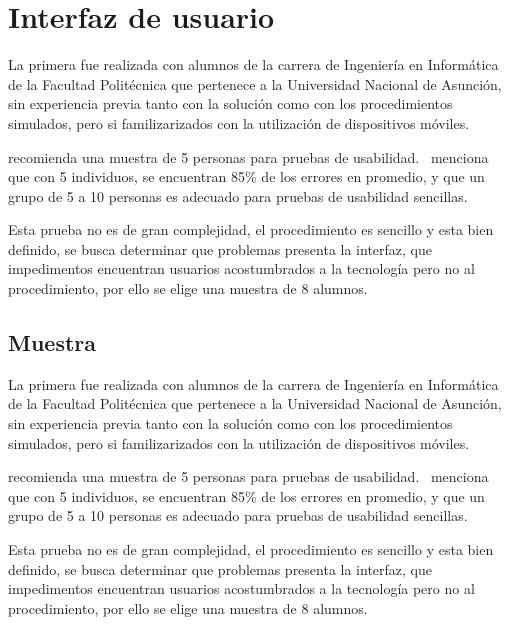 \section{Interfaz de usuario}

La primera fue realizada con alumnos de la carrera de Ingeniería en Informática
de la Facultad Politécnica que pertenece a la Universidad Nacional de Asunción,
sin experiencia previa tanto con la solución como con los procedimientos
simulados, pero si familizarizados con la utilización de dispositivos móviles.

\cite{nielsen2000} recomienda una muestra de 5 personas para pruebas de
usabilidad.~\cite{ritch2009} menciona que con 5 individuos, se encuentran 85\%
de los errores en promedio, y que un grupo de 5 a 10 personas es adecuado para
pruebas de usabilidad sencillas.

Esta prueba no es de gran complejidad, el procedimiento es sencillo y esta
bien definido, se busca determinar que problemas presenta la interfaz, que
impedimentos encuentran usuarios acostumbrados a la tecnología pero no al
procedimiento, por ello se elige una muestra de 8 alumnos.

\subsection{Muestra}

La primera fue realizada con alumnos de la carrera de Ingeniería en Informática
de la Facultad Politécnica que pertenece a la Universidad Nacional de Asunción,
sin experiencia previa tanto con la solución como con los procedimientos
simulados, pero si familizarizados con la utilización de dispositivos móviles.

\cite{nielsen2000} recomienda una muestra de 5 personas para pruebas de
usabilidad.~\cite{ritch2009} menciona que con 5 individuos, se encuentran 85\%
de los errores en promedio, y que un grupo de 5 a 10 personas es adecuado para
pruebas de usabilidad sencillas.

Esta prueba no es de gran complejidad, el procedimiento es sencillo y esta
bien definido, se busca determinar que problemas presenta la interfaz, que
impedimentos encuentran usuarios acostumbrados a la tecnología pero no al
procedimiento, por ello se elige una muestra de 8 alumnos.
